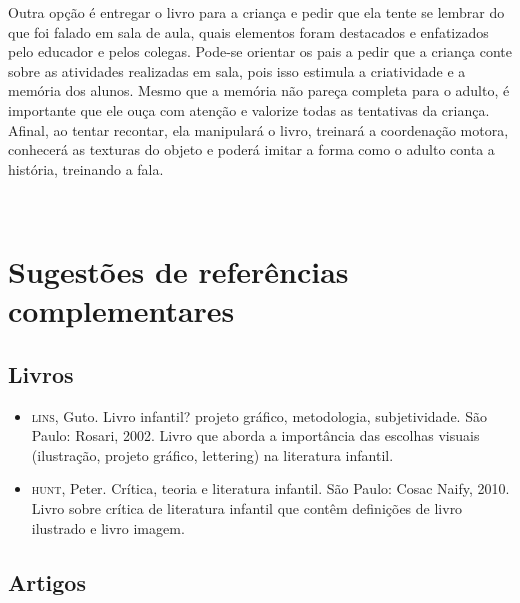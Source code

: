 \documentclass[11pt]{extarticle}
\begin{document}
\begin{enumerate}
Outra opção é entregar o livro para a criança e pedir que ela tente se lembrar
do que foi falado em sala de aula, quais elementos foram destacados e enfatizados pelo educador e pelos colegas. Pode-se orientar os pais a pedir que a criança conte sobre as atividades realizadas em sala, pois isso estimula a criatividade e a memória dos alunos. Mesmo que a memória não pareça 
completa para o adulto, é importante que ele ouça com atenção e 
valorize todas as tentativas da criança. Afinal, ao tentar recontar, 
ela manipulará o livro, treinará a coordenação motora, conhecerá as texturas 
do objeto e poderá imitar a forma como o adulto 
conta a história, treinando a fala. 

\end{enumerate}

 
\section{Sugestões de referências complementares}

\subsection{Livros} 

\begin{itemize}
\item \textsc{lins}, Guto. Livro infantil? projeto gráfico, metodologia, subjetividade. São Paulo: Rosari, 2002.
Livro que aborda a importância das escolhas visuais (ilustração, projeto gráfico, lettering) na literatura infantil.  

\item \textsc{hunt}, Peter. Crítica, teoria e literatura infantil. São Paulo: Cosac Naify, 2010.
Livro sobre crítica de literatura infantil que contêm definições de livro ilustrado e livro imagem. 
\end{itemize}

\subsection{Artigos}
\end{document}
